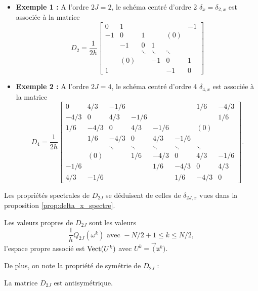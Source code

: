 \begin{itemize}
\item \textbf{Exemple 1 :} A l'ordre $2J=2$,  le schéma centré d'ordre 2 $\delta_x = \delta_{2,x}$ est associée à la matrice
\begin{equation}
D_2 = \dfrac{1}{2h}
\begin{bmatrix}
0 & 1 &   &   &   & -1 \\ 
-1 & 0 & 1 &   & (0) &   \\ 
  & -1 & 0 & 1 &   &   \\ 
  &   & \ddots & \ddots & \ddots &   \\ 
  & (0) &   & -1 & 0 & 1 \\ 
1 &   &   &   & -1 & 0
\end{bmatrix} 
\end{equation}

\item \textbf{Exemple 2 :} A l'ordre $2J=4$,  le schéma centré d'ordre 4 $\delta_{4,x}$ est associée à la matrice
\begin{equation}
D_4 = \dfrac{1}{2h}
\begin{bmatrix}
0 & 4/3 & -1/6 &   &   &   & 1/6 & -4/3 \\ 
-4/3 & 0 & 4/3 & -1/6 &   &   &   & 1/6 \\ 
1/6 & -4/3 & 0 & 4/3 & -1/6 &  & (0) &   \\ 
  & 1/6 & -4/3 & 0 & 4/3 & -1/6 &   &   \\ 
  &   & \ddots & \ddots & \ddots & \ddots & \ddots &   \\ 
  &  (0)& & 1/6 & -4/3 & 0 & 4/3 & -1/6 \\ 
-1/6 &   &   &   & 1/6 & -4/3 & 0 & 4/3 \\ 
4/3 & -1/6 &   &   &   & 1/6 & -4/3 & 0
\end{bmatrix}.
\end{equation}
\end{itemize}

Les propriétés spectrales de $D_{2J}$ se déduisent de celles de $\delta_{2J,x}$ vues dans la proposition \ref{prop:delta_x_spectre}.
\begin{proposition}
Les valeurs propres de $D_{2J}$ sont les valeurs 
\begin{equation}
\dfrac{1}{h}Q_{2J}(\omega^k) \text{ avec }-N/2 +1 \leq k \leq N/2,
\end{equation}
l'espace propre associé est $\text{Vect} (U^k)$ avec $U^k = \vec (\mathfrak{u}^k)$.
\end{proposition}
De plus, on note la propriété de symétrie de $D_{2J}$ :
\begin{proposition}
La matrice $D_{2J}$ est antisymétrique.
\end{proposition}


